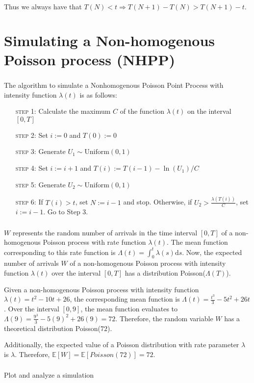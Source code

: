 \documentclass[11pt, oneside]{article}   	%
\begin{document}
Thus we always have that $T(N) < t \Rightarrow T(N + 1) - T(N) > T(N + 1) - t$.
\section{}

\part{Simulating a Non-homogenous Poisson process (NHPP)}
\section{}
The algorithm to simulate a Nonhomogenous Poisson Point Process with intensity function $\lambda(t)$ is as follows:
\begin{enumerate}[leftmargin=30pt,labelindent=65pt,itemindent=30pt]
\item[\textsc{step 1:}] Calculate the maximum $C$ of the function $\lambda(t)$ on the interval $[0,T]$
\item[\textsc{step 2:}] Set $i:=0$ and $T(0):=0$
\item[\textsc{step 3:}] Generate $U_1 \sim \text{Uniform}(0,1)$
\item[\textsc{step 4:}] Set $i:=i+1$ and $T(i) := T(i-1) - \ln(U_1)/C$
\item[\textsc{step 5:}] Generate $U_2 \sim\text{Uniform}(0,1)$
\item[\textsc{step 6:}] If $T(i) > t$, set $N:=i-1$ and stop. Otherwise, if $U_2 > \frac{\lambda(T(i))}{C}$, set $i:=i-1$. Go to Step 3.
\end{enumerate}

\section{}
$W$ represents the random number of arrivals in the time interval $[0, T]$ of a non-homogenous Poisson process with rate function $\lambda(t)$. The mean function corresponding to this rate function is $\Lambda(t) = \int_{0}^{t}\lambda(s)\mathrm{d}s $. Now, the expected number of arrivals $W$ of a non-homogenous Poisson process with intensity function $\lambda(t)$ over the interval $[0, T]$ has a distribution Poisson($\Lambda(T)$). 

Given a non-homogenous Poisson process with intensity function $\lambda(t)=t^2-10t+26$, the corresponding mean function is $\Lambda(t)=\frac{t^3}{3}-5t^2+26t$. Over the interval $[0,9]$, the mean function evaluates to $\Lambda(9)=\frac{9^3}{3} - 5(9)^2+26(9) = 72$. Therefore, the random variable $W$ has a theoretical distribution Poisson($72$).

Additionally, the expected value of a Poisson distribution with rate parameter $\lambda$ is $\lambda$. Therefore, $\mathbb{E}[W]=\mathbb{E}[Poisson(72)]=72$.

\section{}
Plot and analyze a simulation
\end{document}
